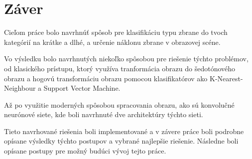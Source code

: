 
\chapter{Záver}

Cieľom práce bolo navrhnúť spôsob pre klasifikáciu typu zbrane do tvoch kategórií na krátke a dlhé, a
    určenie náklonu zbrane v obrazovej scéne.

Vo výsledku bolo navrhnutých niekoľko spôsobou pre riešenie týchto problémov, od klasického prístupu,
    ktorý využíva tranformácia obrazu do šedotónového obrazu a hogovú transformáciu obrazu pomocou
    klasifikatórov ako K-Nearest-Neighbour a Support Vector Machine.

Až po využitie moderných spôsobou spracovania obrazu, ako sú konvolučné neurónové siete, kde boli navrhnuté
    dve architektúry týchto sieti.

Tieto navrhované riešenia boli implementované a v závere práce boli podrobne opísane výsledky týchto postupov a
    vybrané najlepšie riešenie.
Následne boli opísane postupy pre možný budúci vývoj tejto práce.

